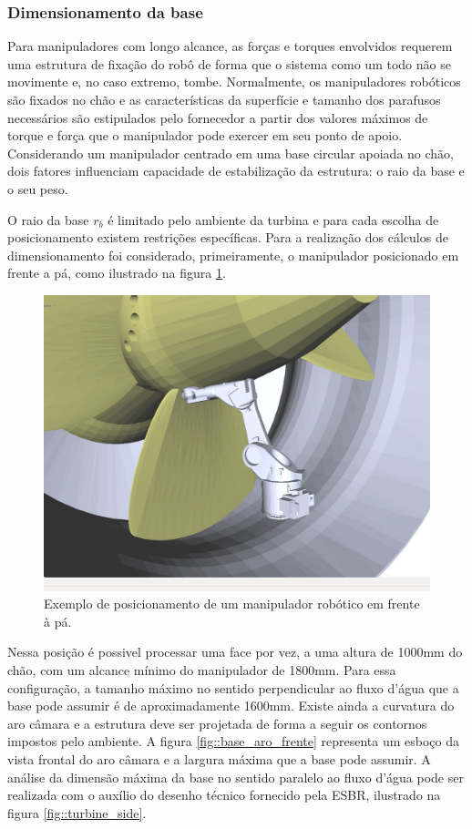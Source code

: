 \subsubsection{Dimensionamento da base}

Para manipuladores com longo alcance, as forças e torques envolvidos requerem
uma estrutura de fixação do robô de forma que o sistema como um todo não se
movimente e, no caso extremo, tombe. Normalmente, os manipuladores robóticos são
fixados no chão e as características da superfície e tamanho dos parafusos
necessários são estipulados pelo fornecedor a partir dos valores máximos de
torque e força que o manipulador pode exercer em seu ponto de apoio.
Considerando um manipulador centrado em uma base circular apoiada no chão, dois
fatores influenciam capacidade de estabilização da estrutura: o raio da base e o seu peso.

O raio da base $r_{b}$ é limitado pelo ambiente da turbina e para cada escolha
de posicionamento existem restrições específicas. 
Para a realização dos cálculos de dimensionamento foi considerado,
primeiramente, o manipulador posicionado em frente a pá, como ilustrado na
figura \ref{fig::robot_front}.

\begin{figure}[H]
\centering
	\includegraphics[width=0.7\columnwidth]{sota/figs/openrave/robot_front_openrave.jpg}
	\caption{Exemplo de posicionamento de um manipulador robótico em frente à pá.}
	\label{fig::robot_front}
\end{figure}

Nessa posição é possivel processar uma face por
vez, a uma altura de 1000mm do chão, com um alcance mínimo do manipulador de
1800mm.
Para essa
configuração, a tamanho máximo no sentido perpendicular ao fluxo d'água que
a base pode assumir é de aproximadamente 1600mm. Existe ainda a curvatura do aro
câmara e a estrutura deve ser projetada de forma a seguir os
contornos impostos pelo ambiente.
A figura \ref{fig::base_aro_frente} 
representa um esboço da vista frontal do aro câmara e a largura máxima que a
base pode assumir. A análise da dimensão máxima da base no sentido paralelo ao
fluxo d'água pode ser realizada com o auxílio do desenho técnico fornecido pela
ESBR, ilustrado na figura \ref{fig::turbine_side}.

